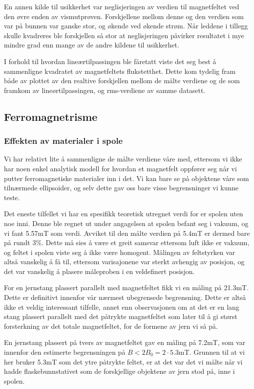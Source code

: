 \documentclass[a4paper,11pt, twocolumn]{article}
\begin{document}
En annen kilde til usikkerhet var neglisjeringen av verdien til magnetfeltet ved den øvre enden av vismutprøven. Forskjellene mellom denne og den verdien som var på bunnen var ganske stor, og økende ved økende strøm. Når leddene i tillegg skulle kvadreres ble forskjellen så stor at neglisjeringen påvirker resultatet i mye mindre grad enn mange av de andre kildene til usikkerhet.

I forhold til hvordan lineærtilpassingen ble fåretatt viste det seg best å sammenligne kvadratet av magnetfeltets flukstetthet. Dette kom tydelig fram både av plottet av den realtive forskjellen mellom de målte verdiene og de som framkom av lineørtilpassingen, og rms-verdiene av samme datasett.
\subsection{Ferromagnetrisme}
\subsubsection{Effekten av materialer i spole}
Vi har relativt lite å sammenligne de målte verdiene våre med, ettersom vi ikke har noen enkel analytisk modell for hvordan et magnetfelt oppfører seg når vi putter ferromagnetiske materialer inn i det. Vi kan bare se på objektene våre som tilnærmede ellipsoider, og selv dette gav oss bare visse begrensninger vi kunne teste. 

Det eneste tilfellet vi har en spesifikk teoretisk utregnet verdi for er spolen uten noe inni. Denne ble regnet ut under angagelsen at spolen befant seg i vakuum, og vi fant 5.57mT som verdi. Avviket til den målte verdien på 5.4mT er dermed bare på rundt 3\%. Dette må sies å være et greit samsvar ettersom luft ikke er vakuum, og feltet i spolen viste seg å ikke være homogent. Målingen av feltstyrken var altså vanskelig å få til, ettersom varisajonene var sterkt avhengig av posisjon, og det var vanskelig å plasere måleproben i en veldefinert posisjon.

For en jernstang plassert parallelt med magnetfeltet fikk vi en måling på 21.3mT. Dette er definitivt innenfor vår nærmest ubegrensede begrensning. Dette er altså ikke et veldig interessant tilfelle, annet enn observasjonen om at det er en lang stang plassert parallelt med det påtrykte magnetfeltet som later til å gi størst forsterkning av det totale magnetfeltet, for de formene av jern vi så på.

En jernstang plassert på tvers av magnetfeltet gav en måling på 7.2mT, som var innenfor den estimerte begrensningen på $B<2B_0 = 2\cdot5.3$mT. Grunnen til at vi her bruker 5.3mT som det ytre påtrykte feltet, er at det var det vi målte når vi hadde flaskebunnstativet som de forskjellige objektene av jern stod på, inne i spolen.
\end{document}
